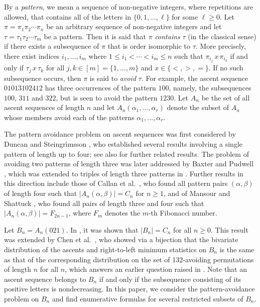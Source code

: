 \documentclass{article}
\theoremstyle{remark}
\theoremstyle{plain}
\begin{document}
By a \emph{pattern}, we mean a sequence of non-negative integers, where repetitions are allowed, that contains all of the letters in $\{0,1,\ldots,\ell\}$ for some $\ell \geq0$.  Let $\pi=\pi_1\pi_2\cdots \pi_n$ be an arbitrary sequence of non-negative integers and let $\tau=\tau_1\tau_2\cdots\tau_m$ be a pattern.  Then it is said that $\pi$ \emph{contains} $\tau$ (in the classical sense) if there exists a subsequence of $\pi$ that is order isomorphic to $\tau$.  More precisely, there exist indices $i_1,\ldots,i_m$ where $1\leq i_1<\cdots<i_m\leq n$ such that $\pi_{i_j}\,x\,\pi_{i_k}$ if and only if $\tau_j\,x\,\tau_k$ for all $j,k \in [m]=\{1,\ldots,m\}$ and $x \in \{<,>,=\}$.  If no such subsequence occurs, then $\pi$ is said to \emph{avoid} $\tau$.  For example, the ascent sequence $01013102412$ has three occurrences of the pattern $100$, namely, the subsequences $100$, $311$ and $322$, but is seen to avoid the pattern $1230$.  Let $A_n$ be the set of all ascent sequences of length $n$ and let $A_n(\alpha_1,\ldots,\alpha_r)$ denote the subset of $A_n$ whose members avoid each of the patterns $\alpha_1,\ldots,\alpha_r$.

The pattern avoidance problem on ascent sequences was first considered by Duncan and Steingr\'{\i}msson \cite{DS}, who established several results involving a single pattern of length up to four; see also \cite{Chen,MS1,Y} for further related results.  The problem of avoiding two patterns of length three was later addressed by Baxter and Pudwell  \cite{BP}, which was extended to triples of length three patterns in \cite{CM0,CM}.  Further results in this direction include those of Callan et al.~\cite{CMS}, who found all pattern pairs $(\alpha,\beta)$ of length four such that $|A_n(\alpha,\beta)|=C_n$ for $n\geq1$, and of Mansour and Shattuck \cite{MS2}, who found all pairs of length three and four such that $|A_n(\alpha,\beta)|=F_{2n-1}$, where $F_m$ denotes the $m$-th Fibonacci number.

Let $B_n=A_n(021)$. In \cite{DS}, it was shown that $|B_n|=C_n$ for all $n\geq0$.  This result was extended by Chen et al.~\cite{Chen}, who showed via a bijection that the bivariate distribution of the ascents and right-to-left minimum statistics on $B_n$ is the same as that of the corresponding distribution on the set of 132-avoiding permutations of length $n$ for all $n$, which answers an earlier question raised in \cite{DS}.  Note that an ascent sequence belongs to $B_n$ if and only if the subsequence consisting of its positive letters is nondecreasing. In this paper, we consider the pattern-avoidance problem on $B_n$ and find enumerative formulas for several restricted subsets of $B_n$.
\end{document}
